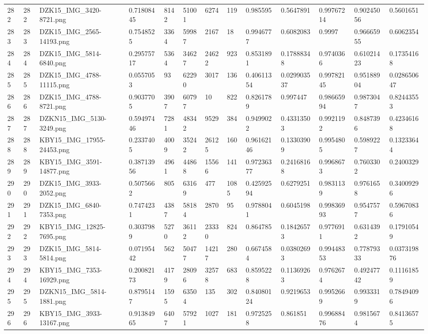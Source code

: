 \documentclass[11pt, a4paper, twoside]{report}
\begin{document}
\begin{longtable}[c]{@{}lllllllllllll@{}}
282 & 282 & DZK15\_IMG\_3420-8721.png & 0.71808445 & 8142 & 51001 & 6274 & 119 & 0.985595 & 0.5647891 & 0.99767214 & 0.90245056 & 0.5601651 \\
283 & 283 & DZK15\_IMG\_2565-14193.png & 0.7548525 & 3364 & 59987 & 2167 & 18 & 0.9946777 & 0.6082083 & 0.9997 & 0.96665955 & 0.6062354 \\
284 & 284 & DZK15\_IMG\_5814-6840.png & 0.29575717 & 5364 & 34627 & 24622 & 923 & 0.8531891 & 0.17888348 & 0.9740366 & 0.61021423 & 0.17354168 \\
285 & 285 & DZK15\_IMG\_4788-11115.png & 0.0557053 & 93 & 62290 & 3017 & 136 & 0.40611354 & 0.029903537 & 0.99782145 & 0.95188904 & 0.028650647 \\
286 & 286 & DZK15\_IMG\_4788-8721.png & 0.9037705 & 3907 & 60797 & 10 & 822 & 0.8261789 & 0.997447 & 0.98665994 & 0.9873047 & 0.82443553 \\
287 & 287 & DZKN15\_IMG\_5130-3249.png & 0.59497446 & 7281 & 48342 & 9529 & 384 & 0.9499022 & 0.43313503 & 0.9921192 & 0.8487396 & 0.42346168 \\
288 & 288 & KBY15\_IMG\_17955-24453.png & 0.2337405 & 4009 & 35242 & 26125 & 160 & 0.96162146 & 0.13303909 & 0.9954805 & 0.5989227 & 0.13233644 \\
289 & 289 & KBY15\_IMG\_3591-14877.png & 0.38713956 & 4961 & 44868 & 15566 & 141 & 0.97236377 & 0.24168168 & 0.9968673 & 0.7603302 & 0.2400329 \\
290 & 290 & DZK15\_IMG\_3933-2052.png & 0.5075662 & 805 & 63169 & 477 & 1085 & 0.42592594 & 0.6279251 & 0.9831139 & 0.9761658 & 0.34009296 \\
291 & 291 & DZK15\_IMG\_6840-7353.png & 0.7474231 & 4387 & 58184 & 2870 & 95 & 0.9788041 & 0.6045198 & 0.99836993 & 0.9547577 & 0.59670836 \\
292 & 292 & KBY15\_IMG\_12825-7695.png & 0.3037989 & 5270 & 36112 & 23330 & 824 & 0.864785 & 0.18426573 & 0.9776911 & 0.6314392 & 0.17910549 \\
293 & 293 & DZK15\_IMG\_5814-5814.png & 0.07195442 & 562 & 50477 & 14217 & 280 & 0.6674584 & 0.03802693 & 0.99448353 & 0.77879333 & 0.037319876 \\
294 & 294 & KBY15\_IMG\_7353-16929.png & 0.20082173 & 4179 & 28096 & 32578 & 683 & 0.8595228 & 0.11369263 & 0.9762674 & 0.49247742 & 0.11161859 \\
295 & 295 & DZKN15\_IMG\_5814-1881.png & 0.8795147 & 1595 & 63504 & 135 & 302 & 0.84080124 & 0.9219653 & 0.9952669 & 0.9933319 & 0.78494096 \\
296 & 296 & KBY15\_IMG\_3933-13167.png & 0.91384965 & 6407 & 57921 & 1027 & 181 & 0.9725258 & 0.861851 & 0.99688476 & 0.9815674 & 0.84136575 \\

\end{longtable}
\end{document}
